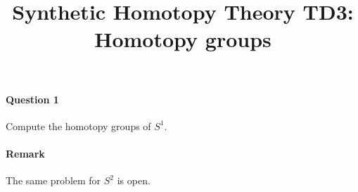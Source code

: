 \documentclass{article}[6pt]%
\title{Synthetic Homotopy Theory TD3: Homotopy groups}
\begin{document}
\maketitle


\begin{Exercise}[title={The homotopy groups of $S^1$}]


\paragraph{Question 1} Compute the homotopy groups of $S^1$. 

\paragraph{Remark} The same problem for $S^2$ is open.
\end{Exercise}
\end{document}
